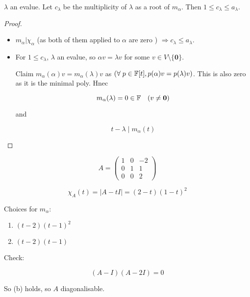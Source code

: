 \documentclass[a4paper]{article}
\begin{document}
\begin{lemma} 
	$ \lambda $ an evalue. Let $ c_{\lambda} $ be the multiplicity of $ \lambda $ as a root of $ m_{\alpha} $. Then $ 1 \leq c_{\lambda} \leq a_{\lambda} $. 
\end{lemma}

\begin{proof}
	\begin{itemize}
		\item $ m_{\alpha} | \chi_{\alpha}  $ (as both of them applied to $ \alpha  $ are zero ) $ \Rightarrow c_{\lambda} \leq a_{\lambda} $. 
		
		\item For $ 1 \leq c_{\lambda} $, $ \lambda $ an evalue, so $ \alpha v = \lambda v $ for some $ v \in V \setminus \{ \mathbf{0} \} $.
		
		Claim $ m_{\alpha}(\alpha) v = m_{\alpha}(\lambda) v $ as $ ( \forall \; p \in \mathbb{F}[t] , p(\alpha) v = p(\lambda) v )    $. This is also zero as it is the minimal poly. Hnec
		
		\[ m_{\alpha}(\lambda) = 0  \in \mathbb{F}  \quad (v \neq \mathbf{0} ) \]
		
		and
		
		\[ t - \lambda \; | \; m_{\alpha}(t) \]
		
		
		
	\end{itemize}
\end{proof}


\begin{eg}
	
	\[ A = \begin{pmatrix}
	1 & 0 & -2 \\
	0 & 1 & 1\\
	0 & 0 & 2
	\end{pmatrix} \]
	  
	  
	  \[ \chi_{A}(t)  = |  A - t I | = (2 - t)(1 - t)^{2}  \]
	
	Choices for $ m_{\alpha} :  $
	
	\begin{enumerate}[label = (\alph*)]
		\item $ (t - 2)(t - 1)^{2} $
		\item $ (t - 2)(t - 1) $
		
	\end{enumerate}	
	Check:
	
	\[ (A - I)(A - 2I) = 0 \]
	
	So (b) holds, so $ A $ diagonalisable.
\end{eg}
\end{document}
